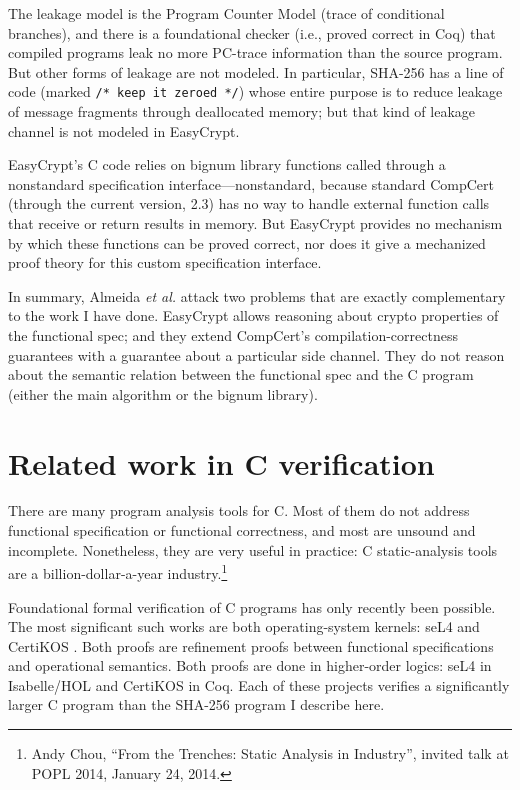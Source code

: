 \documentclass[prodmode,acmtoplas]{acmsmall}
\begin{document}
The leakage model is the Program Counter Model (trace of conditional branches),
and there is a foundational checker (i.e., proved correct  in Coq) that
compiled programs leak no more PC-trace information than the source program.
But other forms of leakage are not modeled.  In particular, SHA-256
has a line of code (marked \verb|/* keep it zeroed */|) whose entire purpose 
is to reduce leakage of message fragments through deallocated memory;
but that kind of leakage channel is not modeled in EasyCrypt.

EasyCrypt's C code relies on bignum library functions called through
a nonstandard specification interface---nonstandard, because
standard CompCert (through the current version, 2.3) has no way to 
handle external function calls that receive or return results in memory.
But EasyCrypt provides no mechanism by which
these functions can be proved correct, nor does it give a 
mechanized proof theory for this custom specification interface.

In summary, Almeida \emph{et al.} attack two problems that are exactly complementary
to the work I have done.  EasyCrypt allows reasoning about crypto properties of
the functional spec; 
and they extend CompCert's compilation-correctness guarantees
with a guarantee about a particular side channel.
They do not reason about the semantic relation between the functional
spec and the C program (either the main algorithm or the bignum library).

\section{Related work in C verification}
There are many program analysis tools for C.  Most of them do not
address functional specification or functional correctness, and most
are unsound and incomplete.  Nonetheless, they are very useful in practice:
C static-analysis tools are a billion-dollar-a-year industry.\footnote{Andy
  Chou, ``From the Trenches: Static Analysis in Industry'', invited
  talk at POPL 2014, January 24, 2014.}

Foundational formal verification of C programs has only
recently been possible.  The most significant such works are
both operating-system kernels:  seL4
\cite{klein2009sel4} and 
CertiKOS \cite{Gu:2011:CCK:2103799.2103803}.
Both proofs are refinement proofs between functional specifications
and operational semantics.  Both proofs are done in
higher-order logics:  seL4 in Isabelle/HOL and CertiKOS in
Coq.  Each of these projects verifies a significantly larger
C program than the SHA-256 program I describe here.
\end{document}

